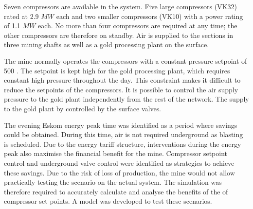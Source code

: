 \par 
 Seven compressors are available in the system. Five large compressors (VK32) rated at 2.9 $MW$ each and two smaller compressors (VK10) with a power rating of 1.1 $MW$ each. No more than four compressors are required at any time; the other compressors are therefore on standby. Air is supplied to the sections in three mining shafts as well as a gold processing plant on the surface. 
 \par 
 The mine normally operates the compressors with a constant pressure setpoint of 500 . The setpoint is kept high for the gold processing plant, which requires constant high pressure throughout the day. This constraint makes it difficult to reduce the setpoints of the compressors. It is possible to control the air supply pressure to the gold plant independently from the rest of the network. The supply to the gold plant by controlled by the surface valves.
 \par 
 The evening Eskom energy peak time was identified as a period where savings could be obtained. During this time, air is not required underground as blasting is scheduled. Due to the energy tariff structure, interventions during the energy peak also maximise the financial benefit for the mine. Compressor setpoint control and underground valve control were identified as strategies to achieve these savings. Due to the risk of loss of production, the mine would not allow practically testing the scenario on the actual system. The simulation was therefore required to accurately calculate and analyse the benefits of the of compressor set points. A model was developed to test these scenarios.

